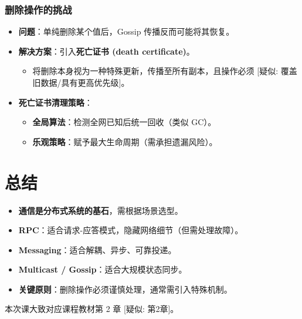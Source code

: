 \subsubsection{删除操作的挑战}

\begin{itemize}
\item \textbf{问题}：单纯删除某个值后，Gossip 传播反而可能将其恢复。
\item \textbf{解决方案}：引入\textbf{死亡证书 (death certificate)}。
  \begin{itemize}
  \item 将删除本身视为一种特殊更新，传播至所有副本，且操作必须 [疑似: 覆盖旧数据/具有更高优先级]。
  \end{itemize}
\item \textbf{死亡证书清理策略}：
  \begin{itemize}
  \item \textbf{全局算法}：检测全网已知后统一回收（类似 GC）。
  \item \textbf{乐观策略}：赋予最大生命周期（需承担遗漏风险）。
  \end{itemize}
\end{itemize}

\section{总结}

\begin{itemize}
\item \textbf{通信是分布式系统的基石}，需根据场景选型。
\item \textbf{RPC}：适合请求-应答模式，隐藏网络细节（但需处理故障）。
\item \textbf{Messaging}：适合解耦、异步、可靠投递。
\item \textbf{Multicast / Gossip}：适合大规模状态同步。
\item \textbf{关键原则}：删除操作必须谨慎处理，通常需引入特殊机制。
\end{itemize}

本次课大致对应课程教材第 2 章 [疑似: 第2章]。
